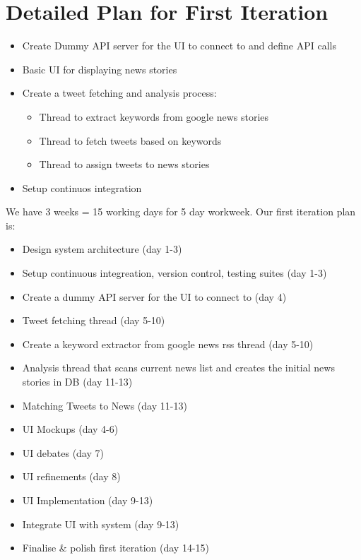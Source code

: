 \documentclass[a4paper,11pt]{article}
\begin{document}
	\section{Detailed Plan for First Iteration}
	\begin{itemize}
	  \item Create Dummy API server for the UI to connect to and define API calls
	  \item Basic UI for displaying news stories
	  \item Create a tweet fetching and analysis process:
	  \begin{itemize}
	    \item Thread to extract keywords from google news stories
	    \item Thread to fetch tweets based on keywords
	    \item Thread to assign tweets to news stories
	  \end{itemize}
	  \item Setup continuos integration
	\end{itemize}
	
	We have 3 weeks = 15 working days for 5 day workweek. Our first iteration plan is:
	
	\begin{itemize}
		\item Design system architecture (day 1-3)
		\item Setup continuous integreation, version control, testing suites (day 1-3)
		\item Create a dummy API server for the UI to connect to (day 4)
		\item Tweet fetching thread (day 5-10)
		\item Create a keyword extractor from google news rss thread (day 5-10)
		\item Analysis thread that scans current news list and creates the initial news stories in DB (day 11-13)
		\item Matching Tweets to News (day 11-13)
		\item UI Mockups (day 4-6)
		\item UI debates (day 7)
		\item UI refinements (day 8)
		\item UI Implementation (day 9-13)
		\item Integrate UI with system (day 9-13)
		\item Finalise \& polish first iteration (day 14-15)
	\end{itemize}
	
\end{document}
